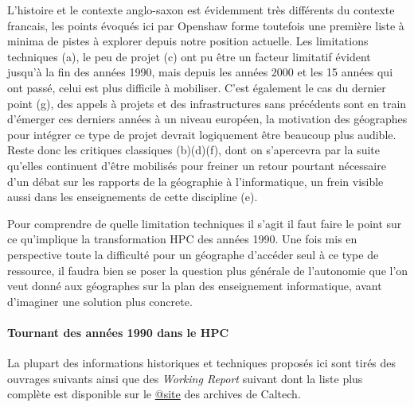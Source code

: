 L'histoire et le contexte anglo-saxon est évidemment très différents du contexte francais, les points évoqués ici par Openshaw forme toutefois une première liste à minima de pistes à explorer depuis notre position actuelle. Les limitations techniques (a), le peu de projet (c) ont pu être un facteur limitatif évident jusqu'à la fin des années 1990, mais depuis les années 2000 et les 15 années qui ont passé, celui est plus difficile à mobiliser. C'est également le cas du dernier point (g), des appels à projets et des infrastructures sans précédents sont en train d'émerger ces derniers années à un niveau européen, la motivation des géographes pour intégrer ce type de projet devrait logiquement être beaucoup plus audible. Reste donc les critiques classiques (b)(d)(f), dont on s'apercevra par la suite qu'elles continuent d'être mobilisés pour freiner un retour pourtant nécessaire d'un débat sur les rapports de la géographie à l'informatique, un frein visible aussi dans les enseignements de cette discipline (e).

Pour comprendre de quelle limitation techniques il s'agit il faut faire le point sur ce qu'implique la transformation HPC des années 1990. Une fois mis en perspective toute la difficulté pour un géographe d'accéder seul à ce type de ressource, il faudra bien se poser la question plus générale de l'autonomie que l'on veut donné aux géographes sur la plan des enseignement informatique, avant d'imaginer une solution plus concrete.

\paragraph{Tournant des années 1990 dans le HPC}
\label{p:Tournant1980}

La plupart des informations historiques et techniques proposés ici sont tirés des ouvrages suivants \autocites{Fox1994, Fox1988, Seitz1985, CM2-1990, Lerman1993, Padua2011, Dietrich1984}[81-84]{Culler1998, Steele2011} ainsi que des \textit{Working Report} suivant \autocites{Athas1987, Su1987, Seitz1983, Seitz1984a, Seitz1984b} dont la liste plus complète est disponible sur le \href{http://authors.library.caltech.edu/view/person-az/Seitz-C-L.html}{@site} des archives de Caltech.


